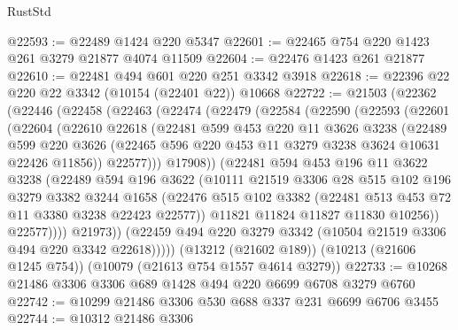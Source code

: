 \begin{lexlean}{RustStd}
\begin{coremodule}
{\begin{coremodule}
{{{{{{{{{{{{{{{{{{{{{{{{{{@22593 := @22489 @1424 @220 @5347
@22601 := @22465 @754 @220 @1423 @261 @3279 @21877 @4074 @11509
@22604 := @22476 @1423 @261 @21877
@22610 := @22481 @494 @601 @220 @251 @3342 @3918
@22618 := @22396 @22 @220 @22 @3342 (@10154 (@22401 @22)) @10668
@22722 := @21503
    (@22362
      (@22446
        (@22458
          (@22463
            (@22474
              (@22479
                (@22584
                  (@22590
                    (@22593
                      (@22601
                        (@22604
                          (@22610
                            @22618
                            (@22481
                              @599
                              @453
                              @220
                              @11
                              @3626
                              @3238
                              (@22489
                                @599
                                @220
                                @3626
                                (@22465 @596 @220 @453 @11 @3279 @3238 @3624 @10631 @22426 @11856))
                              @22577)))
                        @17908))
                    (@22481
                      @594
                      @453
                      @196
                      @11
                      @3622
                      @3238
                      (@22489
                        @594
                        @196
                        @3622
                        (@10111
                          @21519
                          @3306
                          @28
                          @515
                          @102
                          @196
                          @3279
                          @3382
                          @3244
                          @1658
                          (@22476
                            @515
                            @102
                            @3382
                            (@22481 @513 @453 @72 @11 @3380 @3238 @22423 @22577))
                          @11821
                          @11824
                          @11827
                          @11830
                          @10256))
                      @22577))))
              @21973))
          (@22459 @494 @220 @3279 @3342 (@10504 @21519 @3306 @494 @220 @3342 @22618)))))
    (@13212 (@21602 @189))
    (@10213 (@21606 @1245 @754))
    (@10079 (@21613 @754 @1557 @4614 @3279))
@22733 := @10268 @21486 @3306 @3306 @689 @1428 @494 @220 @6699 @6708 @3279 @6760
@22742 := @10299 @21486 @3306 @530 @688 @337 @231 @6699 @6706 @3455
@22744 := @10312 @21486 @3306
}}}}}}}}}}}}}}}}}}}}}}}}}}
\end{coremodule}}
\end{coremodule}
\end{lexlean}
